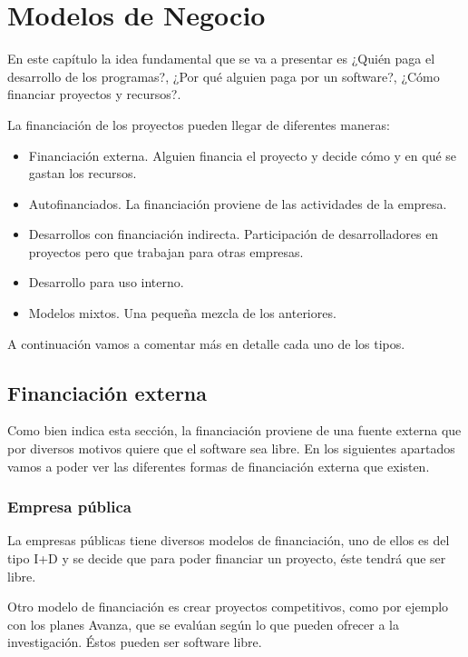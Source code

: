 \chapter{Modelos de Negocio}

En este capítulo la idea fundamental que se va a presentar es ¿Quién paga el
desarrollo de los programas?, ¿Por qué alguien paga por un software?, ¿Cómo
financiar proyectos y recursos?.


La financiación de los proyectos pueden llegar de diferentes maneras:

\begin{itemize}
  \item Financiación externa. Alguien financia el proyecto y decide cómo y en
  qué se gastan los recursos.
  \item Autofinanciados. La financiación proviene de las actividades de la
  empresa.
  \item Desarrollos con financiación indirecta. Participación de desarrolladores
  en proyectos pero que trabajan para otras empresas.
  \item Desarrollo para uso interno.
  \item Modelos mixtos. Una pequeña mezcla de los anteriores.
\end{itemize}

A continuación vamos a comentar más en detalle cada uno de los tipos.


\section{Financiación externa}

Como bien indica esta sección, la financiación proviene de una fuente externa
que por diversos motivos quiere que el software sea libre. En los siguientes
apartados vamos a poder ver las diferentes formas de financiación externa que
existen.

\subsection{Empresa pública}


La empresas públicas tiene diversos modelos de financiación, uno de ellos es
del tipo I+D y se decide que para poder financiar un proyecto, éste tendrá que
ser libre.

Otro modelo de financiación es crear proyectos competitivos, como por ejemplo
con los planes Avanza, que se evalúan según lo que pueden ofrecer a la
investigación. Éstos pueden ser software libre.

